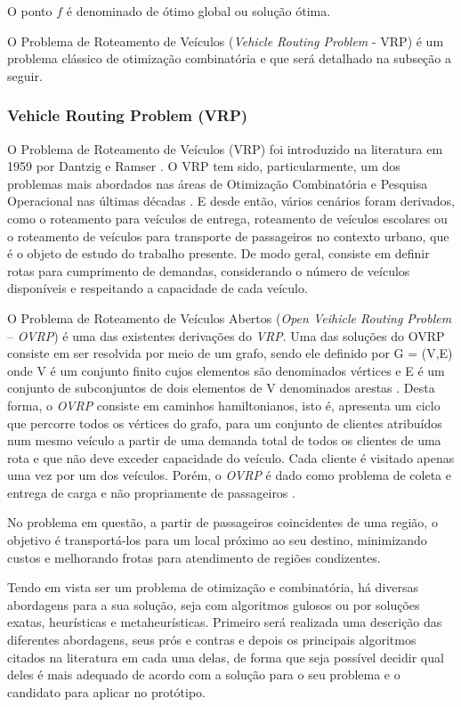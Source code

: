 O ponto \(f\) é denominado de ótimo global ou solução ótima.

O Problema de Roteamento de Veículos (\emph{Vehicle Routing Problem} - VRP) é um problema clássico de otimização combinatória e que será detalhado na subseção a seguir.

\subsubsection{Vehicle Routing Problem (VRP)} \label{vrp}

O Problema de Roteamento de Veículos (VRP) foi introduzido na literatura em 1959 por Dantzig e Ramser \cite{toth}. O VRP tem sido, particularmente, um dos problemas mais abordados nas áreas de Otimização Combinatória e Pesquisa Operacional nas últimas décadas \cite{steiner2000problema}. E desde então, vários cenários foram derivados, como o roteamento para veículos de entrega, roteamento de veículos escolares ou o roteamento de veículos para transporte de passageiros no contexto urbano, que é o objeto de estudo do trabalho presente. De modo geral, consiste em definir rotas para cumprimento de demandas, considerando o número de veículos disponíveis e respeitando a capacidade de cada veículo.

O Problema de Roteamento de Veículos Abertos (\emph{Open Veihicle Routing Problem} -- \emph{OVRP}) é uma das existentes derivações do \emph{VRP}. Uma das soluções do OVRP consiste em ser resolvida por meio de um grafo, sendo ele definido por G = (V,E) onde V é um conjunto finito cujos elementos são denominados vértices e E é um conjunto de subconjuntos de dois elementos de V denominados arestas \cite{nogueira2015introduccao}. Desta forma, o \emph{OVRP} consiste em caminhos hamiltonianos, isto é, apresenta um ciclo que percorre todos os vértices do grafo, para um conjunto de clientes atribuídos num mesmo veículo a partir de uma demanda total de todos os clientes de uma rota e que não deve exceder capacidade do veículo.  Cada cliente é visitado apenas uma vez por um dos veículos. Porém, o \emph{OVRP} é dado como problema de coleta e entrega de carga e não propriamente de passageiros \cite{BRANDAO2004552}.

No problema em questão, a partir de passageiros coincidentes de uma região, o objetivo é transportá-los para um local próximo ao seu destino, minimizando custos e melhorando frotas para atendimento de regiões condizentes. 

Tendo em vista ser um problema de otimização e combinatória, há diversas abordagens para a sua solução, seja com algoritmos gulosos ou por soluções exatas, heurísticas e metaheurísticas. Primeiro será realizada uma descrição das diferentes abordagens, seus prós e contras e depois os principais algoritmos citados na literatura em cada uma delas, de forma que seja possível decidir qual deles é mais adequado de acordo com a solução para o seu problema e o candidato para aplicar no protótipo.

